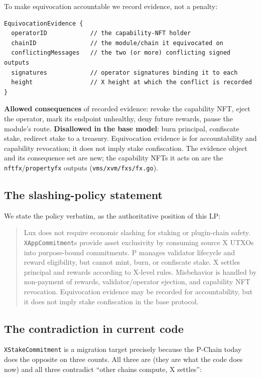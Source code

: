 \noindent To make equivocation accountable we record evidence, not a
penalty:
\begin{lstlisting}
EquivocationEvidence {
  operatorID            // the capability-NFT holder
  chainID               // the module/chain it equivocated on
  conflictingMessages   // the two (or more) conflicting signed outputs
  signatures            // operator signatures binding it to each
  height                // X height at which the conflict is recorded
}
\end{lstlisting}
\noindent \textbf{Allowed consequences} of recorded evidence: revoke the
capability NFT, eject the operator, mark its endpoint unhealthy, deny
future rewards, pause the module's route. \textbf{Disallowed in the base
model}: burn principal, confiscate stake, redirect stake to a treasury.
Equivocation evidence is for accountability and capability revocation; it
does not imply stake confiscation. \DESIGN{} The evidence object and its
consequence set are new; the capability NFTs it acts on are the \IMPL{}
\texttt{nftfx}/\texttt{propertyfx} outputs (\texttt{vms/xvm/fxs/fx.go}).

\subsection{The slashing-policy statement}
\label{sec:slash-policy}

We state the policy verbatim, as the authoritative position of this LP:

\begin{quote}
Lux does not require economic slashing for staking or plugin-chain
safety. \texttt{XAppCommitment}s provide asset exclusivity by consuming
source X UTXOs into purpose-bound commitments. P manages validator
lifecycle and reward eligibility, but cannot mint, burn, or confiscate
stake. X settles principal and rewards according to X-level rules.
Misbehavior is handled by non-payment of rewards, validator/operator
ejection, and capability NFT revocation. Equivocation evidence may be
recorded for accountability, but it does not imply stake confiscation in
the base protocol.
\end{quote}

\subsection{The contradiction in current code}
\label{sec:stake-contradiction}

\texttt{XStakeCommitment} is a migration target precisely because the
P-Chain today does the opposite on three counts. All three are
\IMPL{} (they are what the code does now) and all three contradict
``other chains compute, X settles'':

